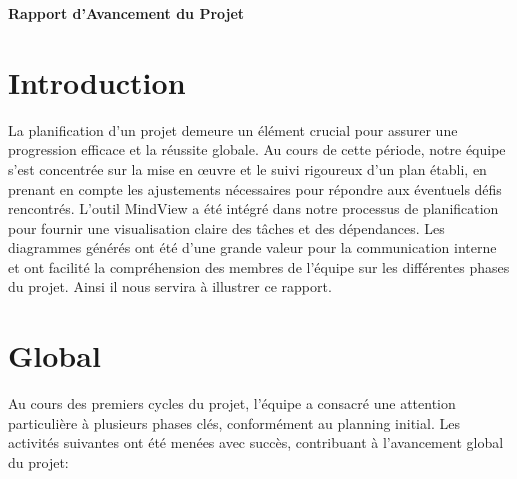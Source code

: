\documentclass[mstat,12pt]{unswthesis}
\begin{document}
\begin{adjustwidth}{-2cm}{}
\textbf{Rapport d'Avancement du Projet}

\hypertarget{introduction-1}{%
\section{Introduction}\label{introduction-1}}

La planification d'un projet demeure un élément crucial pour assurer une
progression efficace et la réussite globale. Au cours de cette période,
notre équipe s'est concentrée sur la mise en œuvre et le suivi rigoureux
d'un plan établi, en prenant en compte les ajustements nécessaires pour
répondre aux éventuels défis rencontrés. L'outil MindView a été intégré
dans notre processus de planification pour fournir une visualisation
claire des tâches et des dépendances. Les diagrammes générés ont été
d'une grande valeur pour la communication interne et ont facilité la
compréhension des membres de l'équipe sur les différentes phases du
projet. Ainsi il nous servira à illustrer ce rapport.

\hypertarget{global}{%
\section{Global}\label{global}}

Au cours des premiers cycles du projet, l'équipe a consacré une
attention particulière à plusieurs phases clés, conformément au planning
initial. Les activités suivantes ont été menées avec succès, contribuant
à l'avancement global du projet:


\end{adjustwidth}
\end{document}
